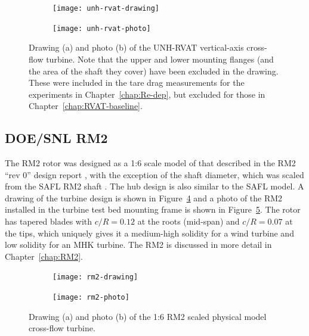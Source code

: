 \begin{figure}
    \centering
    \begin{subfigure}{0.49\textwidth}
        \texttt{[image: unh-rvat-drawing]}
        \caption{}
        \label{fig:rvat-drawing}
    \end{subfigure}
    \begin{subfigure}{0.47\textwidth}
        \texttt{[image: unh-rvat-photo]}
        \caption{}
        \label{fig:rvat-photo}
    \end{subfigure}

    \caption{Drawing (a) and photo (b) of the UNH-RVAT vertical-axis cross-flow
        turbine. Note that the upper and lower mounting flanges (and the area of the
        shaft they cover) have been excluded in the drawing. These were included in
        the tare drag measurements for the experiments in Chapter~\ref{chap:Re-dep},
        but excluded for those in Chapter~\ref{chap:RVAT-baseline}.}

    \label{fig:unh-rvat}
\end{figure}


\subsection{DOE/SNL RM2}

The RM2 rotor was designed as a 1:6 scale model of that described in the RM2
``rev 0'' design report \cite{Barone2011}, with the exception of the shaft
diameter, which was scaled from the SAFL RM2 shaft \cite{Hill2014}. The hub
design is also similar to the SAFL model. A drawing of the turbine design is
shown in Figure~\ref{fig:rm2-drawing} and a photo of the RM2 installed in the
turbine test bed mounting frame is shown in Figure~\ref{fig:rm2-photo}. The
rotor has tapered blades with $c/R=0.12$ at the roots (mid-span) and $c/R=0.07$
at the tips, which uniquely gives it a medium-high solidity for a wind turbine
and low solidity for an MHK turbine. The RM2 is discussed in more detail in
Chapter~\ref{chap:RM2}.

\begin{figure}
    \centering

    \begin{subfigure}{0.45\textwidth}
        \centering
        \texttt{[image: rm2-drawing]}
        \caption{}
        \label{fig:rm2-drawing}
    \end{subfigure}
    \begin{subfigure}{0.41\textwidth}
        \centering
        \texttt{[image: rm2-photo]}

        \caption{}
        \label{fig:rm2-photo}
    \end{subfigure}

    \caption{Drawing (a) and photo (b) of the 1:6 RM2 scaled physical model cross-flow turbine.}
    \label{fig:rm2}
\end{figure}


